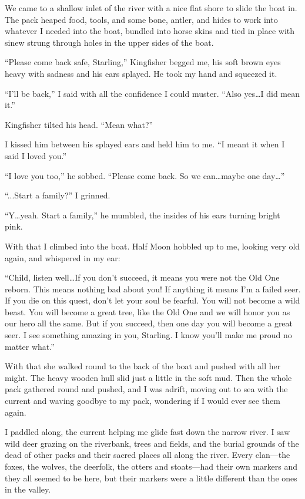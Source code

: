 We came to a shallow inlet of the river with a nice flat shore to slide the boat in. The pack heaped food, tools, and some bone, antler, and hides to work into whatever I needed into the boat, bundled into horse skins and tied in place with sinew strung through holes in the upper sides of the boat.

``Please come back safe, Starling,'' Kingfisher begged me, his soft brown eyes heavy with sadness and his ears splayed. He took my hand and squeezed it.

``I'll be back,'' I said with all the confidence I could muster. ``Also yes\ldots{}I did mean it.''

Kingfisher tilted his head. ``Mean what?''

I kissed him between his splayed ears and held him to me. ``I meant it when I said I loved you.''

``I love you too,'' he sobbed. ``Please come back. So we can\ldots{}maybe one day\ldots''

``...Start a family?'' I grinned.

``Y\ldots{}yeah. Start a family,'' he mumbled, the insides of his ears turning bright pink.

With that I climbed into the boat. Half Moon hobbled up to me, looking very old again, and whispered in my ear:

``Child, listen well\ldots{}If you don't succeed, it means you were not the Old One reborn. This means nothing bad about you! If anything it means I'm a failed seer. If you die on this quest, don't let your soul be fearful. You will not become a wild beast. You will become a great tree, like the Old One and we will honor you as our hero all the same. But if you succeed, then one day you will become a great seer. I see something amazing in you, Starling. I know you'll make me proud no matter what.''

With that she walked round to the back of the boat and pushed with all her might. The heavy wooden hull slid just a little in the soft mud. Then the whole pack gathered round and pushed, and I was adrift, moving out to sea with the current and waving goodbye to my pack, wondering if I would ever see them again.

I paddled along, the current helping me glide fast down the narrow river. I saw wild deer grazing on the riverbank, trees and fields, and the burial grounds of the dead of other packs and their sacred places all along the river. Every clan---the foxes, the wolves, the deerfolk, the otters and stoats---had their own markers and they all seemed to be here, but their markers were a little different than the ones in the valley.

